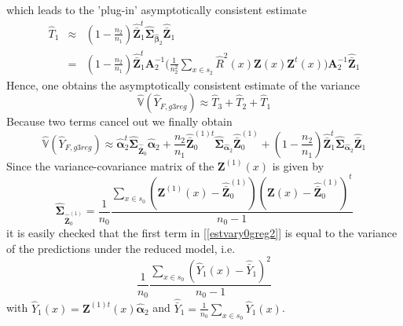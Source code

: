 \documentclass[a4paper,12pt,leqno, titlepage]{article}
\newcommand{\VAR}{\mathbb{V}}
\begin{document}
\begin{appendix}
\begin{equation}
\end{equation}
which leads to the 'plug-in' asymptotically consistent estimate
\begin{eqnarray}\label{appendixhatt1}
\hat{T}_1 &\approx& (1-\frac{n_2}{n_1})\hat{\bar{\pmb{Z}}}_1^{t}\hat{\pmb{\Sigma}}_{\pmb{\hat{\beta}}_2}\hat{\bar{\pmb{Z}}}_1\nonumber \\
&=&(1-\frac{n_2}{n_1})\hat{\bar{\pmb{Z}}}_1^{t}\pmb{A}_2^{-1}\big(\frac{1}{n^2_2}\sum_{x\in{s_2}}
\hat{R}^2(x)\pmb{Z}(x)\pmb{Z}^t(x)\Big)\pmb{A}_2^{-1}\hat{\bar{\pmb{Z}}}_1
\end{eqnarray}
Hence, one obtains the asymptotically consistent estimate of the variance
\begin{equation*}\label{estvary0greg1}
\hat{\VAR}(\hat{Y}_{F,g3reg}) \approx  \hat{T}_3 + \hat{T}_2 + \hat{T}_1
\end{equation*}
Because two terms cancel out we finally obtain
\begin{equation}\label{estvary0greg2}
\hat{\VAR}(\hat{Y}_{F,g3reg}) \approx  \hat{\pmb{\alpha}}_2^t\hat{\pmb{\Sigma}}_{\hat{\bar{\pmb{Z}}}_0}\hat{\pmb{\alpha}}_2
+ \frac{n_2}{n_1}\hat{\bar{\pmb{Z}}}_0^{(1)t}\hat{\pmb{\Sigma}}_{\hat{\pmb{\alpha}}_2}\hat{\bar{\pmb{Z}}}_0^{(1)}
+ (1-\frac{n_2}{n_1})\hat{\bar{\pmb{Z}}}_1^t\hat{\pmb{\Sigma}}_{\hat{\pmb{\alpha}}_2}\hat{\bar{\pmb{Z}}}_1
\end{equation}
Since the variance-covariance matrix of the $\pmb{Z}^{(1)}(x)$ is given by
\begin{equation*}
\hat{\pmb{\Sigma}}_{\hat{\bar{\pmb{Z}}}^{(1)}_{0}}=
\frac{1}{n_{0}}\frac{\sum_{x\in{s_{0}}}(\pmb{Z}^{(1)}(x)-
\hat{\bar{\pmb{Z}}}^{(1)}_{0})(\pmb{Z}(x)-\hat{\bar{\pmb{Z}}}^{(1)}_{0})^t}{n_{0}-1}
\end{equation*}
it is easily checked that the first term in [\ref{estvary0greg2}] is equal to the variance of the predictions under the reduced model, i.e.
\begin{equation*}
\frac{1}{n_0}\frac{\sum_{x\in{s_0}}(\hat{Y}_1(x)-\hat{\bar{Y}}_1)^2}{n_0-1}
\end{equation*}
\noindent with $\hat{Y}_1(x)=\pmb{Z}^{(1)t}(x)\hat{\pmb{\alpha}}_2$ and
$\hat{\bar{Y}}_1=\frac{1}{n_0}\sum_{x\in{s_0}}\hat{Y}_1(x)$.


\end{appendix}
\end{document}
